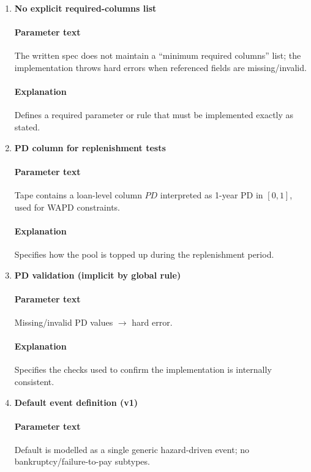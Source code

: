 \documentclass[11pt]{article}
\begin{document}
\begin{enumerate}[label=\arabic*),leftmargin=*,align=left]
\paragraph{Explanation} Defines a required parameter or rule that must be implemented exactly as stated.

\item \textbf{No explicit required-columns list}
\paragraph{Parameter text} The written spec does not maintain a ``minimum required columns'' list; the implementation throws hard errors when referenced fields are missing/invalid.
\paragraph{Explanation} Defines a required parameter or rule that must be implemented exactly as stated.

\item \textbf{PD column for replenishment tests}
\paragraph{Parameter text} Tape contains a loan-level column $PD$ interpreted as 1-year PD in $[0,1]$, used for WAPD constraints.
\paragraph{Explanation} Specifies how the pool is topped up during the replenishment period.

\item \textbf{PD validation (implicit by global rule)}
\paragraph{Parameter text} Missing/invalid PD values $\rightarrow$ hard error.
\paragraph{Explanation} Specifies the checks used to confirm the implementation is internally consistent.

\item \textbf{Default event definition (v1)}
\paragraph{Parameter text} Default is modelled as a single generic hazard-driven event; no bankruptcy/failure-to-pay subtypes.

\end{enumerate}
\end{document}
